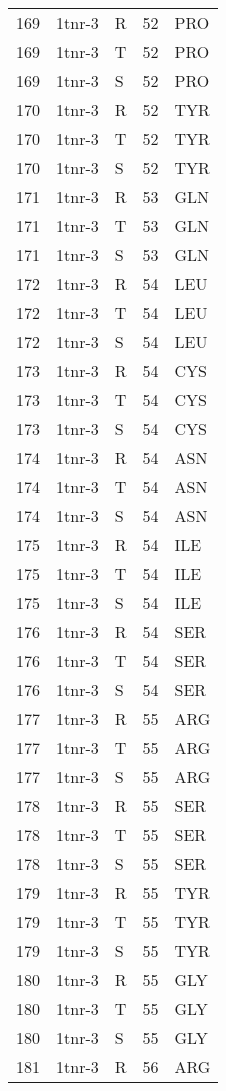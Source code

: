 \begin{longtable}[l]{l|l|l|l|l}
	169 & 1tnr-3 & R & 52 & PRO \\
	169 & 1tnr-3 & T & 52 & PRO \\
	169 & 1tnr-3 & S & 52 & PRO \\
	170 & 1tnr-3 & R & 52 & TYR \\
	170 & 1tnr-3 & T & 52 & TYR \\
	170 & 1tnr-3 & S & 52 & TYR \\
	171 & 1tnr-3 & R & 53 & GLN \\
	171 & 1tnr-3 & T & 53 & GLN \\
	171 & 1tnr-3 & S & 53 & GLN \\
	172 & 1tnr-3 & R & 54 & LEU \\
	172 & 1tnr-3 & T & 54 & LEU \\
	172 & 1tnr-3 & S & 54 & LEU \\
	173 & 1tnr-3 & R & 54 & CYS \\
	173 & 1tnr-3 & T & 54 & CYS \\
	173 & 1tnr-3 & S & 54 & CYS \\
	174 & 1tnr-3 & R & 54 & ASN \\
	174 & 1tnr-3 & T & 54 & ASN \\
	174 & 1tnr-3 & S & 54 & ASN \\
	175 & 1tnr-3 & R & 54 & ILE \\
	175 & 1tnr-3 & T & 54 & ILE \\
	175 & 1tnr-3 & S & 54 & ILE \\
	176 & 1tnr-3 & R & 54 & SER \\
	176 & 1tnr-3 & T & 54 & SER \\
	176 & 1tnr-3 & S & 54 & SER \\
	177 & 1tnr-3 & R & 55 & ARG \\
	177 & 1tnr-3 & T & 55 & ARG \\
	177 & 1tnr-3 & S & 55 & ARG \\
	178 & 1tnr-3 & R & 55 & SER \\
	178 & 1tnr-3 & T & 55 & SER \\
	178 & 1tnr-3 & S & 55 & SER \\
	179 & 1tnr-3 & R & 55 & TYR \\
	179 & 1tnr-3 & T & 55 & TYR \\
	179 & 1tnr-3 & S & 55 & TYR \\
	180 & 1tnr-3 & R & 55 & GLY \\
	180 & 1tnr-3 & T & 55 & GLY \\
	180 & 1tnr-3 & S & 55 & GLY \\
	181 & 1tnr-3 & R & 56 & ARG \\

\end{longtable}
